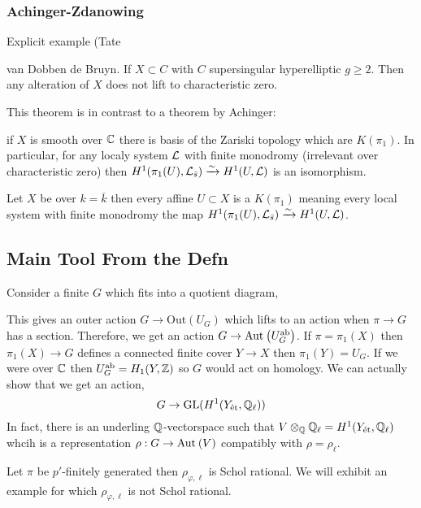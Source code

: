 \documentclass[12pt]{article}
\begin{document}
\subsubsection{Achinger-Zdanowing}

Explicit example (Tate 

van Dobben de Bruyn. If $X \subset C$ with $C$ supersingular hyperelliptic $g \ge 2$. Then any alteration of $X$ does not lift to characteristic zero. 

This theorem is in contrast to a theorem by Achinger: 

\begin{thm}[Artin]
if $X$ is smooth over $\mathbb{C}$ there is basis of the Zariski topology which are $K(\pi_1)$. In particular, for any localy system $\mathcal{L}$ with finite monodromy (irrelevant over characteristic zero) then $H^1(\pi_1(U), \mathcal{L}_{\bar{s}}) \xrightarrow{\sim} H^1(U, \mathcal{L})$ is an isomorphism. 
\end{thm}

\begin{theorem}[Achinger]
Let $X$ be over $k = \overline{k}$ then every affine $U \subset X$ is a $K(\pi_1)$ meaning every local system with finite monodromy the map $H^1(\pi_1(U), \mathcal{L}_{\bar{s}}) \xrightarrow{\sim} H^1(U, \mathcal{L})$. 
\end{theorem}

\subsection{Main Tool From the Defn}

Consider a finite $G$ which fits into a quotient diagram,
\begin{center}
\end{center}
This gives an outer action $G \to \mathrm{Out}(U_G)$ which lifts to an action when $\pi \to G$ has a section. Therefore, we get an action $G \to \mathrm{Aut}_{} \left( U_G^{\mathrm{ab}} \right)$. If $\pi = \pi_1(X)$ then $\pi_1(X) \to G$ defines a connected finite \etale cover $Y \to X$ then $\pi_1(Y) = U_G$. If we were over $\mathbb{C}$ then $U_G^{\mathrm{ab}} = H_1(Y, \mathbb{Z})$ so $G$ would act on homology. We can actually show that we get an action,
\[ G \to \mathrm{GL}(H^1(Y_{\text{\'{e}t}}, \mathbb{Q}_\ell)) \]
In fact, there is an underling $\mathbb{Q}$-vectorspace such that $V \otimes_{\mathbb{Q}} \mathbb{Q}_{\ell} = H^1(Y_{\text{\'{e}t}}, \mathbb{Q}_\ell)$ whcih is a representation $\rho : G \to \mathrm{Aut}_{} \left( V \right)$ compatibly with $\rho = \rho_\ell$. 

\begin{rmk}
Let $\pi$ be $p'$-finitely generated then $\rho_{\varphi, \ell}$ is Schol rational. We will exhibit an example for which $\rho_{\varphi, \ell}$ is not Schol rational.  
\end{rmk}
\end{document}
